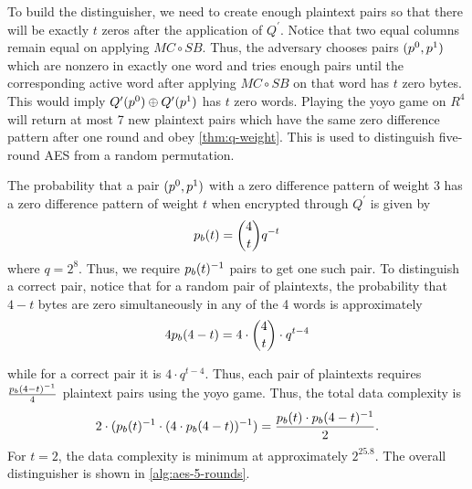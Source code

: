 \documentclass[twoside]{article}
\begin{document}
To build the distinguisher, we need to create enough plaintext pairs so that
there will be exactly \(t\) zeros after the application of \(Q^\prime\). Notice
that two equal columns remain equal on applying \(MC \circ SB\). Thus, the
adversary chooses pairs \((p^0, p^1)\) which are nonzero in exactly one
word and tries enough pairs until the corresponding active word after applying
\(MC \circ SB\) on that word has \(t\) zero bytes. This would imply
\(Q^\prime(p^0) \oplus Q^\prime(p^1)\) has \(t\) zero words. Playing
the yoyo game on \(R^4\) will return at most 7 new plaintext pairs which have
the same zero difference pattern after one round and obey
\autoref{thm:q-weight}. This is used to distinguish five-round AES from a random
permutation.

The probability that a pair \((p^0, p^1)\) with a zero difference pattern
of weight 3 has a zero difference pattern of weight \(t\) when encrypted through
\(Q^\prime\) is given by
\begin{equation}
    p_b(t) = \binom{4}{t}q^{-t}
\end{equation}
where \(q = 2^8\). Thus, we require \(p_b(t)^{-1}\) pairs to get one such
pair. To distinguish a correct pair, notice that for a random pair of
plaintexts, the probability that \(4 - t\) bytes are zero simultaneously in any
of the 4 words is approximately
\begin{equation}
    4p_b(4 - t) = 4 \cdot \binom{4}{t} \cdot q^{t - 4}
\end{equation}

while for a correct pair it is \(4 \cdot q^{t - 4}\). Thus, each pair of
plaintexts requires \(\frac{p_b(4 - t)^{-1}}{4}\) plaintext pairs using the
yoyo game. Thus, the total data complexity is
\begin{equation}
    2 \cdot (p_b(t)^{-1} \cdot (4 \cdot p_b(4 - t))^{-1}) = \frac{p_b(t) \cdot p_b(4 - t)^{-1}}{2}.
\end{equation}
For \(t = 2\), the data complexity is minimum at approximately \(2^{25.8}\). The
overall distinguisher is shown in \autoref{alg:aes-5-rounds}.
\end{document}
